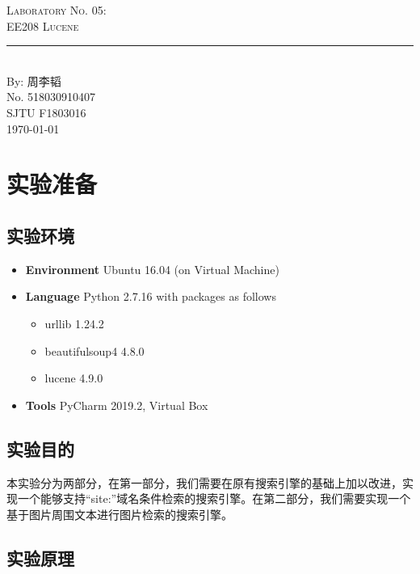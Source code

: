 \documentclass{article}
\newcommand{\labno}{05}
\newcommand{\labtitle}{EE208 Lucene}
\newcommand{\authorname}{周李韬}
\newcommand{\studentno}{518030910407}
\newcommand{\classno}{F1803016}
\begin{document}
\begin{center}
{\LARGE \textsc{Laboratory No. \labno:} \\ \vspace{4pt}}
{\Large \textsc{\labtitle} \\ \vspace{4pt}} 
\rule[13pt]{\textwidth}{1pt} \\ \vspace{15pt}
{\large By: \authorname \\ \vspace{10pt}
No. \studentno \\ \vspace{10pt}
SJTU \classno \\ \vspace{10pt}
\today \vspace{20pt}}
\end{center}



\section{实验准备}

\subsection{实验环境}
\begin{itemize}
\item\textbf{Environment} Ubuntu 16.04 (on Virtual Machine)
\item\textbf{Language} Python 2.7.16 with packages as follows
	\begin{itemize}
	\item urllib 1.24.2
	\item beautifulsoup4 4.8.0
	\item lucene 4.9.0
	\end{itemize}
\item\textbf{Tools} PyCharm 2019.2, Virtual Box
\end{itemize}

\subsection{实验目的}
本实验分为两部分，在第一部分，我们需要在原有搜索引擎的基础上加以改进，实现一个能够支持“site:”域名条件检索的搜索引擎。在第二部分，我们需要实现一个基于图片周围文本进行图片检索的搜索引擎。

\subsection{实验原理}
\label{sec:principle}
\end{document}
